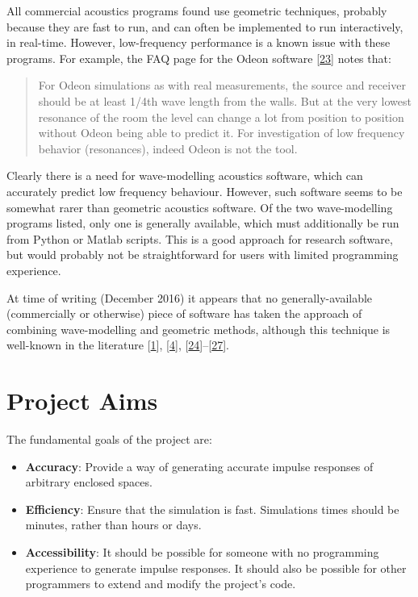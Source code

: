 \documentclass[]{scrreprt}
\providecommand{\tightlist}{%
  \setlength{\itemsep}{0pt}\setlength{\parskip}{0pt}}
\begin{document}
All commercial acoustics programs found use geometric techniques,
probably because they are fast to run, and can often be implemented to
run interactively, in real-time. However, low-frequency performance is a
known issue with these programs. For example, the FAQ page for the Odeon
software {[}\protect\hyperlink{ref-ux5fodeonux5f2016-1}{23}{]} notes
that:

\begin{quote}
For Odeon simulations as with real measurements, the source and receiver
should be at least 1/4th wave length from the walls. But at the very
lowest resonance of the room the level can change a lot from position to
position without Odeon being able to predict it. For investigation of
low frequency behavior (resonances), indeed Odeon is not the tool.
\end{quote}

Clearly there is a need for wave-modelling acoustics software, which can
accurately predict low frequency behaviour. However, such software seems
to be somewhat rarer than geometric acoustics software. Of the two
wave-modelling programs listed, only one is generally available, which
must additionally be run from Python or Matlab scripts. This is a good
approach for research software, but would probably not be
straightforward for users with limited programming experience.

At time of writing (December 2016) it appears that no
generally-available (commercially or otherwise) piece of software has
taken the approach of combining wave-modelling and geometric methods,
although this technique is well-known in the literature
{[}\protect\hyperlink{ref-southernux5fspatialux5f2011}{1}{]},
{[}\protect\hyperlink{ref-aretzux5fcombinedux5f2009}{4}{]},
{[}\protect\hyperlink{ref-southernux5fhybridux5f2013}{24}{]}--{[}\protect\hyperlink{ref-vorlanderux5fsimulationux5f2009}{27}{]}.

\section{Project Aims}\label{project-aims}

The fundamental goals of the project are:

\begin{itemize}
\tightlist
\item
  \textbf{Accuracy}: Provide a way of generating accurate impulse
  responses of arbitrary enclosed spaces.
\item
  \textbf{Efficiency}: Ensure that the simulation is fast. Simulations
  times should be minutes, rather than hours or days.
\item
  \textbf{Accessibility}: It should be possible for someone with no
  programming experience to generate impulse responses. It should also
  be possible for other programmers to extend and modify the project's
  code.
\end{itemize}
\end{document}
